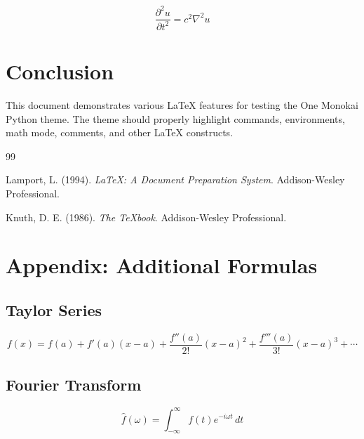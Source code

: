 \documentclass[12pt,a4paper]{article}
\theoremstyle{definition}
\theoremstyle{remark}
\begin{document}
\[
\frac{\partial^2 u}{\partial t^2} = c^2 \nabla^2 u
\]

\section{Conclusion}

This document demonstrates various \LaTeX{} features for testing the One Monokai Python theme. The theme should properly highlight commands, environments, math mode, comments, and other \LaTeX{} constructs.

\begin{thebibliography}{99}

Lamport, L. (1994).
\textit{\LaTeX: A Document Preparation System}.
Addison-Wesley Professional.

Knuth, D. E. (1986).
\textit{The \TeX book}.
Addison-Wesley Professional.

\end{thebibliography}

\appendix

\section{Appendix: Additional Formulas}

\subsection{Taylor Series}

\[
f(x) = f(a) + f'(a)(x-a) + \frac{f''(a)}{2!}(x-a)^2 + \frac{f'''(a)}{3!}(x-a)^3 + \cdots
\]

\subsection{Fourier Transform}

\[
\hat{f}(\omega) = \int_{-\infty}^{\infty} f(t) e^{-i\omega t} \, dt
\]
\end{document}
